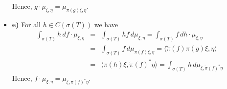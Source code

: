 \documentclass[12pt]{article}
\begin{document}
\begin{itemize}
Hence, $g \cdot \mu_{\xi, \eta} = \mu_{\pi(g)\xi, \eta}$.
\item[] {\bf e)} For all $h \in C(\sigma(T))$ we have
\begin{eqnarray*}
\int_{\sigma(T)} h \, df \cdot\mu_{\xi, \eta} & = & \int_{\sigma(T)} hf \, d\mu_{\xi, \eta} = \int_{\sigma(T)} f \, dh \cdot\mu_{\xi, \eta}\\
& = & \int_{\sigma(T)} f \, d\mu_{\pi(f)\xi, \eta} = \langle \widetilde{\pi}(f)\pi(g) \xi, \eta \rangle\\
& = & \langle \pi(h) \xi, \widetilde{\pi}(f)^*\eta \rangle = \int_{\sigma(T)} h \, d\mu_{\xi, \widetilde{\pi}(f)^*\eta}
\end{eqnarray*}
Hence, $f \cdot \mu_{\xi, \eta} = \mu_{\xi, \widetilde{\pi}(f)^* \eta}$.
\end{itemize}
\end{document}
